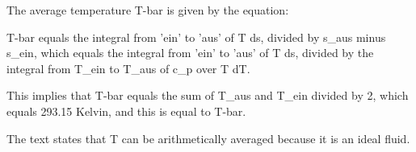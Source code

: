 The average temperature T-bar is given by the equation:

T-bar equals the integral from 'ein' to 'aus' of T ds, divided by s_aus minus s_ein, which equals the integral from 'ein' to 'aus' of T ds, divided by the integral from T_ein to T_aus of c_p over T dT.

This implies that T-bar equals the sum of T_aus and T_ein divided by 2, which equals 293.15 Kelvin, and this is equal to T-bar.

The text states that T can be arithmetically averaged because it is an ideal fluid.